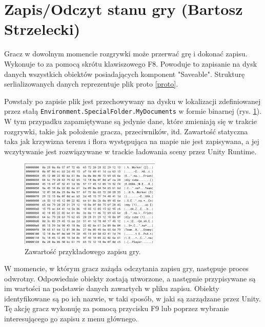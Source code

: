 \section{Zapis/Odczyt stanu gry (Bartosz Strzelecki)}

Gracz w dowolnym momencie rozgrywki może przerwać grę i dokonać zapisu. Wykonuje to
za pomocą skrótu klawiszowego F8. Powoduje to zapisanie na dysk danych wszystkich obiektów posiadających
komponent "Saveable". Strukturę serlializowanych danych reprezentuje plik proto \ref{proto}.


Powstały po zapisie plik jest przechowywany na dysku w lokalizacji zdefiniowanej przez stałą \verb|Environment.SpecialFolder.MyDocuments| w formie binarnej (rys. \ref{save}).
W tym przypadku zapamiętywane są jedynie dane, które zmieniają się w trakcie rozgrywki, takie jak położenie gracza, przeciwników, itd. 
Zawartość statyczna taka jak krzywizna terenu i flora występująca na mapie nie jest zapisywana, a jej wczytywanie jest rozwiązywane
w trackie ładowania sceny przez Unity Runtime.

\begin{figure}[h]
\centering
\includegraphics[width=0.6\textwidth]{images/save}
\caption{Zawartość przykładowego zapisu gry.}
\label{save}
\end{figure}

W momencie, w którym gracz zażąda odczytania zapisu gry, następuje proces odwrotny. Odpowiednie obiekty zostają utworzone,
a następnie przypisywane są im wartości na podstawie danych zawartych w pliku zapisu. Obiekty identyfikowane
są po ich nazwie, w taki sposób, w jaki są zarządzane przez Unity.
Tę akcję gracz wykonuję za pomocą przycisku F9 lub poprzez wybranie interesującego go zapisu z menu głównego.

